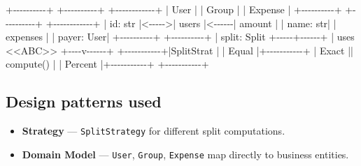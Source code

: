 \documentclass[11pt]{article}
\providecommand{\tightlist}{\setlength{\itemsep}{1pt}\setlength{\parskip}{0pt}}
\newenvironment{Shaded}{\begin{snugshade}}{\end{snugshade}}
\newcommand{\BuiltInTok}[1]{\textcolor[rgb]{0.50,0.55,0.55}{#1}}
\newcommand{\NormalTok}[1]{\textcolor[rgb]{0.81,0.81,0.76}{#1}}
\newcommand{\OperatorTok}[1]{\textcolor[rgb]{0.81,0.81,0.76}{#1}}
\begin{document}
\begin{Shaded}
\begin{Highlighting}[]
\OperatorTok{+{-}{-}{-}{-}{-}{-}{-}{-}{-}{-}+}       \OperatorTok{+{-}{-}{-}{-}{-}{-}{-}{-}{-}{-}+}       \OperatorTok{+{-}{-}{-}{-}{-}{-}{-}{-}{-}{-}{-}{-}+}
\OperatorTok{|}\NormalTok{  User    }\OperatorTok{|}       \OperatorTok{|}\NormalTok{  Group   }\OperatorTok{|}       \OperatorTok{|}\NormalTok{  Expense   }\OperatorTok{|}
\OperatorTok{+{-}{-}{-}{-}{-}{-}{-}{-}{-}{-}+}       \OperatorTok{+{-}{-}{-}{-}{-}{-}{-}{-}{-}{-}+}       \OperatorTok{+{-}{-}{-}{-}{-}{-}{-}{-}{-}{-}{-}{-}+}
\OperatorTok{|} \BuiltInTok{id}\NormalTok{: }\BuiltInTok{str}  \OperatorTok{|\textless{}{-}{-}{-}{-}{-}\textgreater{}|}\NormalTok{ users    }\OperatorTok{|\textless{}{-}{-}{-}{-}{-}{-}|}\NormalTok{ amount     }\OperatorTok{|}
\OperatorTok{|}\NormalTok{ name: }\BuiltInTok{str}\OperatorTok{|}       \OperatorTok{|}\NormalTok{ expenses }\OperatorTok{|}       \OperatorTok{|}\NormalTok{ payer: User}\OperatorTok{|}
\OperatorTok{+{-}{-}{-}{-}{-}{-}{-}{-}{-}{-}+}       \OperatorTok{+{-}{-}{-}{-}{-}{-}{-}{-}{-}{-}+}       \OperatorTok{|}\NormalTok{ split: Split}
                                      \OperatorTok{+{-}{-}{-}{-}{-}+{-}{-}{-}{-}{-}{-}+}
                                            \OperatorTok{|}\NormalTok{ uses}
                              \OperatorTok{\textless{}\textless{}}\NormalTok{ABC}\OperatorTok{\textgreater{}\textgreater{}}  \OperatorTok{+{-}{-}{-}{-}}\NormalTok{v}\OperatorTok{{-}{-}{-}{-}{-}{-}+}
                         \OperatorTok{+{-}{-}{-}{-}{-}{-}{-}{-}{-}{-}{-}+|}\NormalTok{SplitStrat }\OperatorTok{|}
                         \OperatorTok{|}\NormalTok{  Equal    }\OperatorTok{|+{-}{-}{-}{-}{-}{-}{-}{-}{-}{-}{-}+}
                         \OperatorTok{|}\NormalTok{  Exact    }\OperatorTok{||}\NormalTok{ compute() }\OperatorTok{|}
                         \OperatorTok{|}\NormalTok{  Percent  }\OperatorTok{|+{-}{-}{-}{-}{-}{-}{-}{-}{-}{-}{-}+}
                         \OperatorTok{+{-}{-}{-}{-}{-}{-}{-}{-}{-}{-}{-}+}
\end{Highlighting}
\end{Shaded}

\subsection{Design patterns used}\label{design-patterns-used-3}

\begin{itemize}
\tightlist
\item
  \textbf{Strategy} --- \texttt{SplitStrategy} for different split computations.
\item
  \textbf{Domain Model} --- \texttt{User}, \texttt{Group}, \texttt{Expense} map directly to business entities.
\end{itemize}
\end{document}

